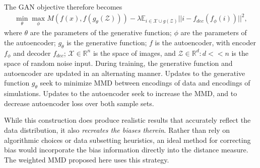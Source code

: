 The GAN objective therefore becomes
\begin{align}
\min_{\theta} \max_{\phi} M (f(x), f(g_\theta(\mathcal{Z}))) - \lambda \mathbb{E}_{i \in \mathcal{X} \cup g(\mathcal{Z})} ||i - f_{dec}(f_\phi(i))||^2, 
\end{align}
where $\theta$ are the parameters of the generative function; $\phi$ are the parameters of the autoencoder; $g_\theta$ is the generative function; $f$ is the autoencoder, with encoder $f_\phi$ and decoder $f_{dec}$; $\mathcal{X} \in \mathbb{R}^n$ is the space of images, and $\mathcal{Z} \in \mathbb{R}^d: d << n$ is the space of random noise input. During training, the generative function and autoencoder are updated in an alternating manner. Updates to the generative function $g_\theta$ seek to minimize MMD between encodings of data and encodings of simulations. Updates to the autoencoder seek to increase the MMD, and to decrease autoencoder loss over both sample sets.

While this construction does produce realistic results that accurately reflect the data distribution, it also \textit{recreates the biases therein}. Rather than rely on algorithmic choices or data subsetting heuristics, an ideal method for correcting bias would incorporate the bias information directly into the distance measure. The weighted MMD proposed here uses this strategy.
